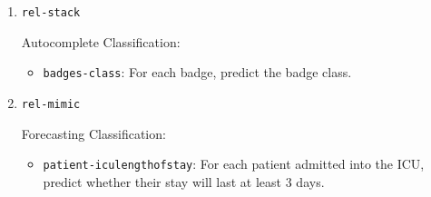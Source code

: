 \begin{enumerate}
  Autocomplete Classification:
  \begin{itemize}
    \item \texttt{item-plant}: For each sales order item, predict its plant (production/storage facility).
    \item \texttt{item-shippoint}: For each sales order item, predict its shipping point (dispatch location).
    \item \texttt{item-incoterms}: For each sales order item, predict its item-level international commercial terms.
    \item \texttt{sales-office}: For each sales order, predict the sales office responsible for managing sales activities for the relevant products and geographic region.
    \item \texttt{sales-group}: For each sales order, predict the sales group, i.e. the subdivision within the distribution chain that handles the customer and transaction.
    \item \texttt{sales-payterms}: For each sales order, predict the customer payment terms (payment deadlines/discounts).
    \item \texttt{sales-shipcond}: For each sales order, predict the shipping condition (logistics terms).
    \item \texttt{sales-incoterms}: Predict the header-level Incoterms (international commercial terms) for each sales order.
  \end{itemize}


  \item \texttt{rel-stack} 

  Autocomplete Classification:
  \begin{itemize}
    \item \texttt{badges-class}: For each badge, predict the badge class.
  \end{itemize}


  \item \texttt{rel-mimic} 

  Forecasting Classification:
  \begin{itemize}
    \item \texttt{patient-iculengthofstay}: For each patient admitted into the ICU, predict whether their stay will last at least 3 days.
  \end{itemize}

\end{enumerate}
